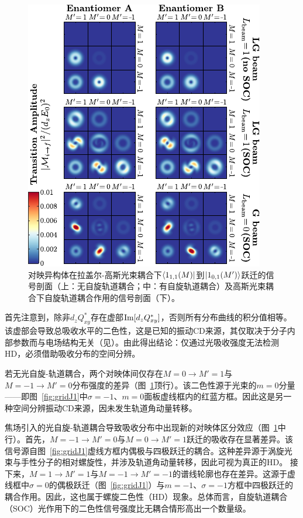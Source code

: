 \documentclass[reprint,aps,prl,twocolumn,superscriptaddress,groupedaddress]{revtex4-2}
\begin{document}
\begin{CJK*}{UTF8}{gbsn}
\begin{figure}[t!]
    \centering
    \includegraphics[width=1.0\columnwidth]{Figure2.pdf}
    \caption{对映异构体在拉盖尔-高斯光束耦合下$\bra{1_{1,1}(M)}$到$\ket{1_{0,1}(M')}$跃迁的信号剖面（上：无自旋轨道耦合；中：有自旋轨道耦合）及高斯光束耦合下自旋轨道耦合作用的信号剖面（下）。}
    \label{fig:profiles}
\end{figure}
首先注意到，除非$d_zQ_{xy}^*$存在虚部${\rm Im}[d_zQ_{xy}^*]$，否则所有分布曲线的积分值相等。该虚部会导致总吸收水平的二色性，这是已知的振动CD来源，其仅取决于分子内部参数而与电场结构无关（见\cite{Buckingham1971}）。由此得出结论：仅通过光吸收强度无法检测HD，必须借助吸收分布的空间分辨\cite{Loeffler2011}。

若无光自旋-轨道耦合，两个对映体间仅存在$M=0\to M'=1$与$M=-1\to M'=0$分布强度的差异（图~\ref{fig:profiles}顶行）。该二色性源于光束的$m=0$分量——即图~\ref{fig:gridJ1}中$\sigma=-1$、$m=0$面板虚线框内的红蓝方框。因此这是另一种空间分辨振动CD来源，因未发生轨道角动量转移。

焦场引入的光自旋-轨道耦合导致吸收分布中出现新的对映体区分效应（图~\ref{fig:profiles}中行）。首先，$M=-1\to M'=0$与$M=0\to M'=1$跃迁的吸收存在显著差异。该信号源自图~\ref{fig:gridJ1}虚线方框内偶极与四极跃迁的耦合。这种差异源于涡旋光束与手性分子的相对螺旋性，并涉及轨道角动量转移，因此可视为真正的HD。
接下来，$M=1\to M'=1$与$M=-1\to M'=-1$的谱线轮廓也存在差异。这源于虚线框中$\sigma=0$的偶极跃迁（图~\ref{fig:gridJ1}）与$m=-1$、$\sigma=-1$方框中四极跃迁的耦合作用。因此，这也属于螺旋二色性（HD）现象。总体而言，自旋轨道耦合（SOC）光作用下的二色性信号强度比无耦合情形高出一个数量级。


\end{CJK*}
\end{document}
